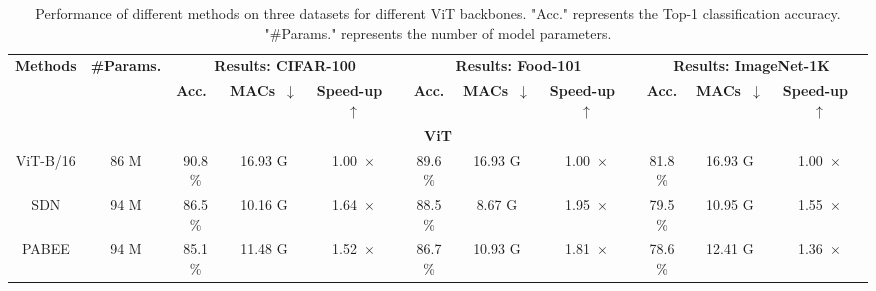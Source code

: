 \begin{table*}
  \renewcommand{\arraystretch}{0.9}
  \centering
  \setlength{\extrarowheight}{0pt}
  \addtolength{\extrarowheight}{\aboverulesep}
  \addtolength{\extrarowheight}{\belowrulesep}
  \setlength{\aboverulesep}{0pt}
  \setlength{\belowrulesep}{0pt}
  \caption{Performance of different methods on three datasets for different ViT backbones. "Acc." represents the Top-1 classification accuracy. "\#Params." represents the number of model parameters.}
  \label{tb:performance}
  \vspace{-7pt}
  \begin{tabular}{c|c|ccc|ccc|ccc} 
  \toprule
  \multirow{2}{*}{\textbf{Methods}}               & \multirow{2}{*}{\textbf{\#Params.}} & \multicolumn{3}{c|}{\textbf{Results: CIFAR-100}}                             & \multicolumn{3}{c|}{\textbf{Results: Food-101}}                              & \multicolumn{3}{c}{\textbf{Results: ImageNet-1K}}                             \\
                                                  &                                     & \textbf{Acc.~}   & \textbf{MACs~$\downarrow$} & \textbf{Speed-up~$\uparrow$} & \textbf{Acc.}    & \textbf{MACs~$\downarrow$} & \textbf{Speed-up~$\uparrow$} & \textbf{Acc.}    & \textbf{MACs~$\downarrow$} & \textbf{Speed-up~$\uparrow$}  \\ 
  \hline
  \multicolumn{11}{c}{\textbf{ViT}}                                                                                                                                                                                                                                                                                                   \\ 
  \hline
  ViT-B/16                                        & 86 M                                & 90.8 \%          & 16.93 G                    & 1.00~$\times$                & 89.6 \%          & 16.93 G                    & 1.00~$\times$                & 81.8 \%          & 16.93 G                    & 1.00~$\times$                 \\ 
  \hline
  SDN                                             & 94 M                                & 86.5 \%          & 10.16 G                    & 1.64~$\times$                & 88.5 \%          & 8.67 G                     & 1.95~$\times$                & 79.5 \%          & 10.95 G                    & 1.55~$\times$                 \\
  PABEE                                           & 94 M                                & 85.1 \%          & 11.48 G                    & 1.52~$\times$                & 86.7 \%          & 10.93 G                    & 1.81~$\times$                & 78.6 \%          & 12.41 G                    & 1.36~$\times$                 \\

\end{tabular}
\end{table*}
